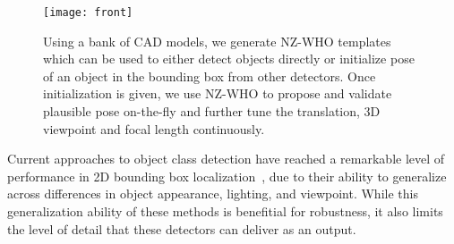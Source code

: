 \begin{figure}[t]
  \centering
  \texttt{[image: front]} %
  \caption{Using a bank of CAD models, we generate NZ-WHO templates which can be used to either detect objects directly or initialize pose of an object in the bounding box from other detectors. Once initialization is given, we use NZ-WHO to propose and validate plausible pose on-the-fly and further tune the translation, 3D viewpoint and focal length continuously.}
  \label{fig:front}
\end{figure}
 

Current approaches to object class detection have reached a remarkable
level of performance in 2D bounding box
localization~\cite{pascal12,Felzenszwalb10,Girshick14}, due to their
ability to generalize across differences in object appearance,
lighting, and viewpoint. While this generalization
ability of these methods is benefitial for robustness, it also limits
the level of detail that these detectors can deliver as an output.

